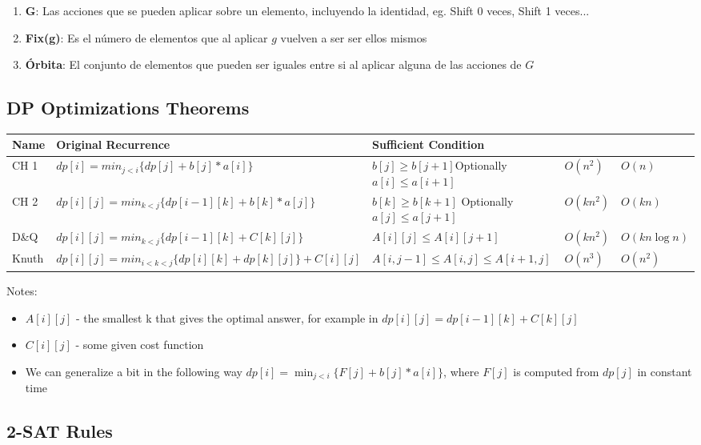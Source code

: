 \documentclass[10pt,letterpaper,twocolumn,twosided]{article}
\begin{document}
\begin{enumerate}
    \item \textbf{G}: Las acciones que se pueden aplicar sobre un elemento, incluyendo la identidad, eg. Shift 0 veces, Shift 1 veces...
    \item \textbf{Fix(g)}: Es el número de elementos que al aplicar $g$ vuelven a ser ser ellos mismos
    \item \textbf{Órbita}: El conjunto de elementos que pueden ser iguales entre si al aplicar alguna de las acciones de $G$
\end{enumerate}

\subsection{DP Optimizations Theorems}
\begin{tabular}{|p{0.8cm}| p{4.5cm}| p{3.3cm}|p{0.9cm}| p{1.3cm}|}
	\hline
	Name & Original Recurrence & Sufficient Condition &  &  \\ 
	\hline
	CH 1 & $dp[i] = min_{j<i}\{dp[j] + b[j] * a[i]\}$ & $b[j] \geq b[j+1]$Optionally $a[i] \leq a[i+1]$ & $O(n^2)$ & $O(n)$ \\ 
	\hline
	CH 2 & $dp[i][j] = min_{k<j}\{dp[i-1][k] + b[k] * a[j]\}$ & $b[k] \geq b[k+1]$ Optionally $a[j] \leq a[j+1]$ & $O(kn^2)$ & $O(kn)$ \\ 
	\hline
	D\&Q & $dp[i][j] = min_{k<j}\{dp[i-1][k] + C[k][j]\}$ & $A[i][j] \leq A[i][j+1]$ & $O(kn^2)$ & $O(kn\log n)$ \\ 
	\hline
	Knuth & $dp[i][j] = min_{i<k<j}\{dp[i][k] + dp[k][j]\} + C[i][j]$ & $A[i, j -1] \leq A[i, j] \leq A[i+1, j]$ & $O(n^3)$ & $O(n^2)$ \\ 
	\hline
\end{tabular} 

Notes:

\begin{itemize}
	\item $A[i][j]$ - the smallest k that gives the optimal answer, for example in $dp[i][j] = dp[i-1][k] + C[k][j]$
	\item $C[i][j]$ - some given cost function
	\item We can generalize a bit in the following way $dp[i] = \min_{j<i}\{F[j]+b[j] * a[i]\}$, where $F[j]$ is computed from $dp[j]$ in constant time
\end{itemize}


\subsection{2-SAT Rules}
\end{document}
